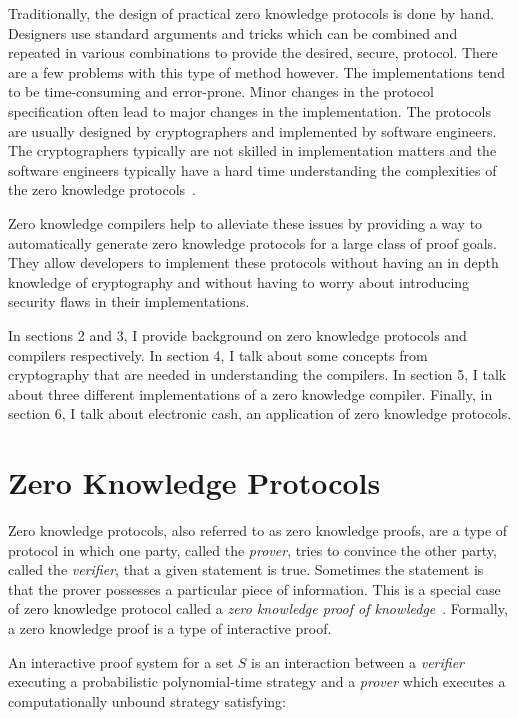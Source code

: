 \documentclass{sig-alternate}
\begin{document}
	Traditionally, the design of practical zero knowledge protocols
	is done by hand. Designers use standard arguments and tricks which
	can be combined and repeated in various combinations to provide the 
	desired, secure, protocol. There are a few problems with this type
	of method however. The implementations tend to be time-consuming
	and error-prone. Minor changes in the protocol specification often
	lead to major changes in the implementation. The protocols are usually
	designed by cryptographers and implemented by software engineers. The
	cryptographers typically are not skilled in implementation matters and
	the software engineers typically have a hard time understanding the
	complexities of the zero knowledge protocols~\cite{Sigma:2009}. 

	Zero knowledge compilers help to alleviate these issues by providing
	a way to automatically generate zero knowledge protocols for a large
	class of proof goals. They allow developers to implement these protocols
	without having an in depth knowledge of cryptography and without having to
	worry about introducing security flaws in their implementations.

	In sections 2 and 3, I provide background on zero knowledge protocols and
	compilers respectively. In section 4, I talk about some concepts from
	cryptography that are needed in understanding the compilers.
	In section 5, I talk about three different implementations of a zero knowledge 
	compiler. Finally, in section 6, I talk about electronic cash, an application 
	of zero knowledge protocols.

\section{Zero Knowledge Protocols}
	Zero knowledge protocols, also referred to as zero knowledge proofs, are a type
	of protocol in which one party, called the \textit{prover}, tries to convince the 
	other party, called the \textit{verifier}, that a given statement is true. Sometimes
	the statement is that the prover possesses a particular piece of information. This
	is a special case of zero knowledge protocol called a \textit{zero knowledge proof
	of knowledge}~\cite{Wiki}. Formally, a zero knowledge proof is a type of interactive
	proof.
	
	An interactive proof system for a set $S$ is an interaction between a
	\textit{verifier} executing a probabilistic polynomial-time strategy and
	a \textit{prover} which executes a computationally unbound strategy 
	satisfying:
			
\end{document}
